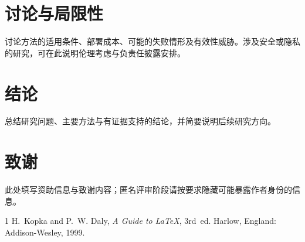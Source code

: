 \documentclass[conference]{IEEEtran}
\begin{document}
\section{讨论与局限性}
讨论方法的适用条件、部署成本、可能的失败情形及有效性威胁。涉及安全或隐私的研究，可在此说明伦理考虑与负责任披露安排。

\section{结论}
总结研究问题、主要方法与有证据支持的结论，并简要说明后续研究方向。

\section*{致谢}
此处填写资助信息与致谢内容；匿名评审阶段请按要求隐藏可能暴露作者身份的信息。

% 
% 
\begin{thebibliography}{1}
H.~Kopka and P.~W. Daly, \emph{A Guide to \LaTeX}, 3rd~ed.
Harlow, England: Addison-Wesley, 1999.
\end{thebibliography}
\end{document}
